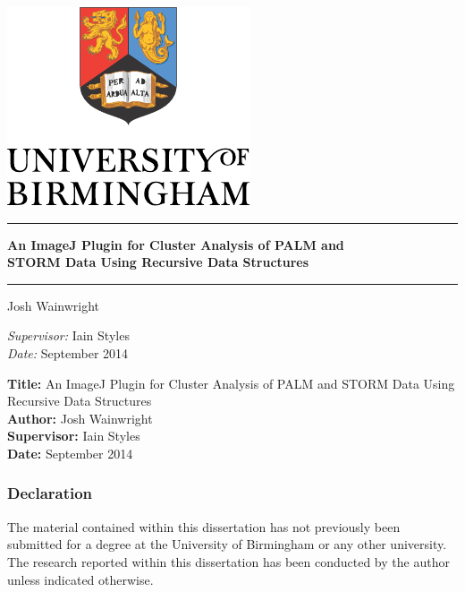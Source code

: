 
\begin{titlepage}
	\begin{center}
		\vspace*{\fill}

		\centering
		\includegraphics[scale=1.3]{Logo.pdf}
		\vfill

		\hrule
		{\LARGE\bf An ImageJ Plugin for Cluster Analysis of PALM and \\
		STORM Data Using Recursive Data Structures \\[0.4cm]}
		\hrule

		\vfill
		{\Large Josh Wainwright}
		\vfill

		\vfill
		\textit{Supervisor:} Iain Styles \\
		\vfill
		\textit{Date:} September 2014
		\vfill
		\vfill

	\end{center}
\end{titlepage}

\thispagestyle{empty}

\textbf{Title:} An ImageJ Plugin for Cluster Analysis of PALM and STORM Data
Using Recursive Data Structures \\
\textbf{Author:} Josh Wainwright \\
\textbf{Supervisor:} Iain Styles \\
\textbf{Date:} September 2014 \\
\textbf{}
\vfill
\vfill

\subsubsection*{Declaration}

The material contained within this dissertation has not previously been
submitted for a degree at the University of Birmingham or any other university.
The research reported within this dissertation has been conducted by the author
unless indicated otherwise.\\


